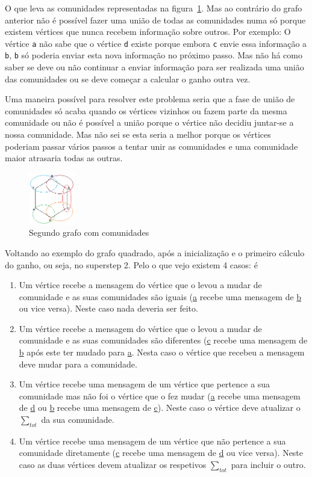 \documentclass[a4paper,10pt]{report}
\begin{document}
O que leva as comunidades representadas na figura~\ref{fig:esb4}. Mas ao contrário do grafo anterior não é possível fazer uma união de todas as comunidades numa só porque existem vértices que nunca recebem informação sobre outros. Por exemplo: O vértice \texttt{a} não sabe que o vértice \texttt{d} existe porque embora \texttt{c} envie essa informação a \texttt{b}, \texttt{b} só poderia enviar esta nova informação no próximo passo. Mas não há como saber se deve ou não continuar a enviar informação para ser realizada uma união das comunidades ou se deve começar a calcular o ganho outra vez.

Uma maneira possível para resolver este problema seria que a fase de união de comunidades só acaba quando os vértices vizinhos ou fazem parte da mesma comunidade ou não é possível a união porque o vértice não decidiu juntar-se a nossa comunidade. Mas não sei se esta seria a melhor porque os vértices poderiam passar vários passos a tentar unir as comunidades e uma comunidade maior atrasaria todas as outras.

\begin{figure}
\includegraphics[width=20mm]{esboco4}
\caption{Segundo grafo com comunidades\label{fig:esb4}}
\end{figure}

\newpage

Voltando ao exemplo do grafo quadrado, após a inicialização e o primeiro cálculo do ganho, ou seja, no superstep 2. Pelo o que vejo existem 4 casos: é

\begin{enumerate}
	\item Um vértice recebe a mensagem do vértice que o levou a mudar de comunidade e as suas comunidades são iguais (\underline{a} recebe uma mensagem de \underline{b} ou vice versa). Neste caso nada deveria ser feito.
	\item Um vértice recebe a mensagem do vértice que o levou a mudar de comunidade e as suas comunidades são diferentes (\underline{c} recebe uma mensagem de \underline{b} após este ter mudado para \underline{a}. Nesta caso o vértice que recebeu a mensagem deve mudar para a comunidade.
	\item Um vértice recebe uma mensagem de um vértice que pertence a sua comunidade mas não foi o vértice que o fez mudar (\underline{a} recebe uma mensagem de \underline{d} ou \underline{b} recebe uma mensagem de \underline{c}). Neste caso o vértice deve atualizar o $\sum_{tot}$ da sua comunidade.
	\item Um vértice recebe uma mensagem de um vértice que não pertence a sua comunidade diretamente (\underline{c} recebe uma mensagem de \underline{d} ou vice versa). Neste caso as duas vértices devem atualizar os respetivos $\sum_{tot}$ para incluir o outro.
\end{enumerate}
\end{document}
